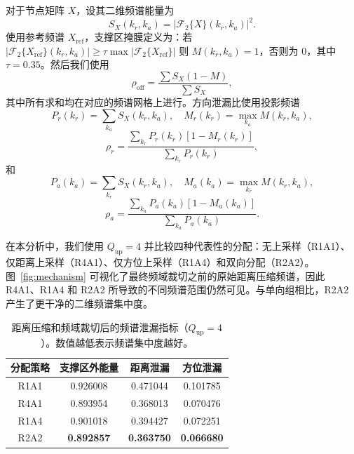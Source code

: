 \documentclass[conference]{IEEEtran}
\begin{document}
对于节点矩阵 $X$，设其二维频谱能量为
\begin{equation}
S_X(k_r,k_a)=|\mathcal{F}_2\{X\}(k_r,k_a)|^2 .
\end{equation}
使用参考频谱 $X_{\mathrm{ref}}$，支撑区掩膜定义为：若 $|\mathcal{F}_2\{X_{\mathrm{ref}}\}(k_r,k_a)|\geq \tau \max |\mathcal{F}_2\{X_{\mathrm{ref}}\}|$ 则 $M(k_r,k_a)=1$，否则为 $0$，其中 $\tau=0.35$。然后我们使用
\begin{equation}
\rho_{\mathrm{off}}=\frac{\sum S_X(1-M)}{\sum S_X},
\end{equation}
其中所有求和均在对应的频谱网格上进行。方向泄漏比使用投影频谱
\begin{equation}
P_r(k_r)=\sum_{k_a}S_X(k_r,k_a), \quad
M_r(k_r)=\max_{k_a}M(k_r,k_a),
\end{equation}
\begin{equation}
\rho_r=
\frac{\sum_{k_r}P_r(k_r)[1-M_r(k_r)]}{\sum_{k_r}P_r(k_r)},
\end{equation}
和
\begin{equation}
P_a(k_a)=\sum_{k_r}S_X(k_r,k_a), \quad
M_a(k_a)=\max_{k_r}M(k_r,k_a),
\end{equation}
\begin{equation}
\rho_a=
\frac{\sum_{k_a}P_a(k_a)[1-M_a(k_a)]}{\sum_{k_a}P_a(k_a)}.
\end{equation}

在本分析中，我们使用 $Q_{\mathrm{up}}=4$ 并比较四种代表性的分配：无上采样（R1A1）、仅距离上采样（R4A1）、仅方位上采样（R1A4）和双向分配（R2A2）。图~\ref{fig:mechanism} 可视化了最终频域裁切之前的原始距离压缩频谱，因此 R4A1、R1A4 和 R2A2 所导致的不同频谱范围仍然可见。与单向组相比，R2A2 产生了更干净的二维频谱集中度。

\begin{table}[t]
\caption{距离压缩和频域裁切后的频谱泄漏指标（$Q_{\mathrm{up}}=4$）。数值越低表示频谱集中度越好。}
\begin{center}
\scriptsize
\begin{tabular}{c c c c}
\hline
分配策略 & 支撑区外能量 & 距离泄漏 & 方位泄漏 \\
\hline
R1A1 & 0.926008 & 0.471044 & 0.101785 \\
R4A1 & 0.893954 & 0.368013 & 0.070476 \\
R1A4 & 0.901018 & 0.394427 & 0.072251 \\
R2A2 & \textbf{0.892857} & \textbf{0.363750} & \textbf{0.066680} \\
\hline
\end{tabular}
\label{tab:mechanism_metrics}
\end{center}
\end{table}
\end{document}
